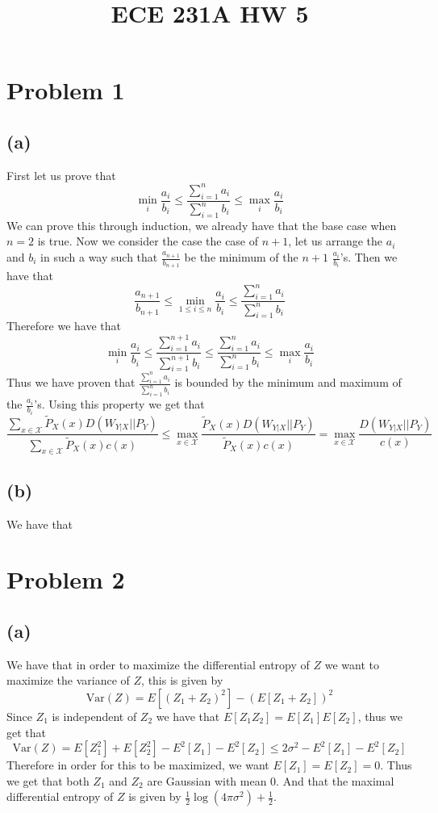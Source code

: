 
\title{ECE 231A HW 5}

\maketitle
\section*{Problem 1}
\subsection*{(a)}
First let us prove that 
$$\min_{i}\frac{a_i}{b_i}\leq\frac{\sum_{i=1}^{n}a_i}{\sum_{i=1}^{n}b_i}\leq\max_{i}\frac{a_i}{b_i}$$
We can prove this through induction, we already have that 
the base case when $n=2$ is true. Now
we consider the case the case of $n+1$, let us 
arrange the $a_i$ and $b_i$ in such a way such that 
$\frac{a_{n+1}}{b_{n+1}}$ be the minimum of the $n+1$ $\frac{a_{i}}{b_{i}}$'s. 
Then we have that  
$$\frac{a_{n+1}}{b_{n+1}} \leq \min_{1\leq i\leq n}\frac{a_i}{b_i}
\leq \frac{\sum_{i=1}^{n}a_i}{\sum_{i=1}^{n}b_i}$$
Therefore we have that 
$$\min_{i}\frac{a_i}{b_i}\leq\frac{\sum_{i=1}^{n+1}a_i}{\sum_{i=1}^{n+1}b_i}
\leq\frac{\sum_{i=1}^{n}a_i}{\sum_{i=1}^{n}b_i}\leq \max_{i}\frac{a_i}{b_i}$$
Thus we have proven that $\frac{\sum_{i=1}^{n}a_i}{\sum_{i=1}^{n}b_i}$ 
is bounded by the minimum and maximum of the $\frac{a_i}{b_i}$'s. Using this property we get
that 
$$\frac{\sum_{x\in \mathcal{X}}\tilde{P}_X(x)D(W_{Y|X}||P_Y)}
{\sum_{x\in \mathcal{X}}\tilde{P}_X(x)c(x)}\leq 
\max_{x\in \mathcal{X}} \frac{\tilde{P}_X(x)D(W_{Y|X}||P_Y)}{\tilde{P}_X(x)c(x)}=\max_{x\in \mathcal{X}} \frac{D(W_{Y|X}||P_Y)}{c(x)}$$
\subsection*{(b)}
We have that 

\section*{Problem 2}
\subsection*{(a)}
We have that in order to maximize the 
differential entropy of $Z$ we want to maximize
the variance of $Z$, this is given by 
$$\text{Var}(Z)=E[(Z_1+Z_2)^2]-(E[Z_1+Z_2])^2$$
Since $Z_1$ is independent of $Z_2$ we have that
$E[Z_1Z_2]=E[Z_1]E[Z_2]$, thus we get that 
$$\text{Var}(Z)=E[Z_1^2]+E[Z_2^2]-E^2[Z_1]-E^2[Z_2]\leq 2\sigma^2 -E^2[Z_1]-E^2[Z_2]$$
Therefore in order for this to be maximized, we want $E[Z_1]=E[Z_2]=0$. 
Thus we get that both $Z_1$ and $Z_2$ are Gaussian with mean 0. And that 
the maximal differential entropy of $Z$ is given by $\frac{1}{2}\log(4\pi \sigma^2)+\frac{1}{2}$.
